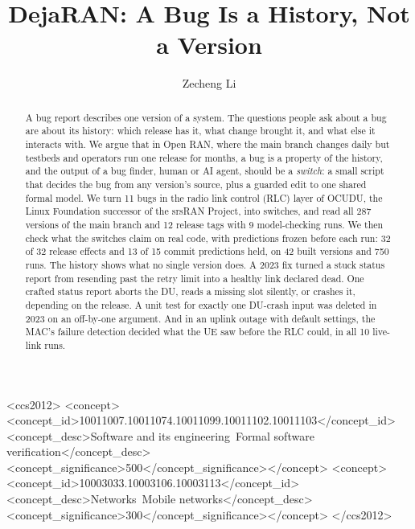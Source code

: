 \documentclass[sigconf,10pt]{acmart}
\begin{document}
\title{DejaRAN: A Bug Is a History, Not a Version}

\author{Zecheng Li}

\begin{CCSXML}
<ccs2012>
<concept><concept_id>10011007.10011074.10011099.10011102.10011103</concept_id>
<concept_desc>Software and its engineering~Formal software verification</concept_desc>
<concept_significance>500</concept_significance></concept>
<concept><concept_id>10003033.10003106.10003113</concept_id>
<concept_desc>Networks~Mobile networks</concept_desc>
<concept_significance>300</concept_significance></concept>
</ccs2012>
\end{CCSXML}

\begin{abstract}
A bug report describes one version of a system. The questions people ask
about a bug are about its history: which release has it, what change
brought it, and what else it interacts with. We argue that in Open RAN,
where the main branch changes daily but testbeds and operators run one
release for months, a bug is a property of the history, and the output
of a bug finder, human or AI agent, should be a \emph{switch}: a small
script that decides the bug from any version's source, plus a guarded
edit to one shared formal model. We turn 11 bugs in the radio link
control (RLC) layer of OCUDU, the Linux Foundation successor of the
srsRAN Project, into switches, and read all 287 versions of the main
branch and 12 release tags with 9 model-checking runs. We then check
what the switches claim on real code, with predictions frozen before
each run: 32 of 32 release effects and 13 of 15 commit predictions
held, on 42 built versions and 750 runs. The history shows what no
single version does. A 2023 fix turned a stuck status report from
resending past the retry limit into a healthy link declared dead. One
crafted status report aborts the DU, reads a missing slot silently, or
crashes it, depending on the release. A unit test for exactly one
DU-crash input was deleted in 2023 on an off-by-one argument. And in an
uplink outage with default settings, the MAC's failure detection decided
what the UE saw before the RLC could, in all 10 live-link runs.
\end{abstract}
\end{document}
